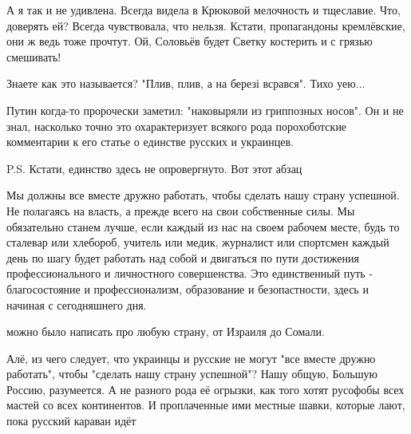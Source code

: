 \begin{itemize}
А я так и не удивлена. Всегда видела в Крюковой мелочность и тщеславие. Что,
доверять ей? Всегда чувствовала, что нельзя. Кстати, пропагандоны кремлёвские,
они ж ведь тоже прочтут. Ой, Соловьёв будет Светку костерить и с грязью
смешивать!

 
Знаете как это называется?
"Плив, плив, а на березі всрався".
Тихо уею...

 

Путин когда-то пророчески заметил: "наковыряли из гриппозных носов". Он и не
знал, насколько точно это охарактеризует всякого рода порохоботские комментарии
к его статье о единстве русских и украинцев.

P.S. Кстати, единство здесь не опровергнуто. Вот этот абзац

Мы должны все вместе дружно работать, чтобы сделать нашу страну успешной. Не
полагаясь на власть, а прежде всего на свои собственные силы. Мы обязательно
станем лучше, если каждый из нас на своем рабочем месте, будь то сталевар или
хлебороб, учитель или медик, журналист или спортсмен каждый день по шагу будет
работать над собой и двигаться по пути достижения профессионального и
личностного совершенства. Это единственный путь - благосостояние и
профессионализм, образование и безопастности, здесь и начиная с сегодняшнего
дня.

можно было написать про любую страну, от Израиля до Сомали.

Алё, из чего следует, что украинцы и русские не могут "все вместе дружно
работать", чтобы "сделать нашу страну успешной"? Нашу общую, Большую Россию,
разумеется. А не разного рода её огрызки, как того хотят русофобы всех мастей
со всех континентов. И проплаченные ими местные шавки, которые лают, пока
русский караван идёт

 

\end{itemize}
